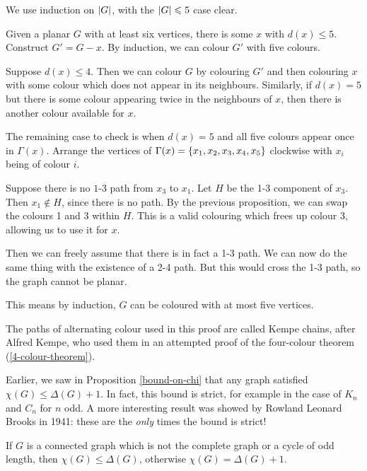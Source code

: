 \documentclass{article}
\begin{document}
\begin{prf}
    We use induction on $\left\lvert G \right\rvert$, with the $\left\lvert G \right\rvert \leqslant 5$ case clear.

	Given a planar $G$ with at least six vertices, there is some $x$ with $d(x) \leq 5$. Construct $G' = G - x$. By induction, we can colour $G'$ with five colours.

	Suppose $d(x) \leq 4$. Then we can colour $G$ by colouring $G'$ and then colouring $x$ with some colour which does not appear in its neighbours. Similarly, if $d(x) = 5$ but there is some colour appearing twice in the neighbours of $x$, then there is another colour available for $x$.
	
	The remaining case to check is when $d(x) = 5$ and all five colours appear once in $\Gamma(x)$. Arrange the vertices of $\Gamma(x) = \left\lbrace x_1, x_2, x_3, x_4, x_5 \right\rbrace$ clockwise with $x_i$ being of colour $i$.

	Suppose there is no $1$-$3$ path from $x_3$ to $x_1$. Let $H$ be the 1-3 component of $x_3$. Then $x_1 \notin H$, since there is no path. By the previous proposition, we can swap the colours 1 and 3 within $H$. This is a valid colouring which frees up colour 3, allowing us to use it for $x$.

	Then we can freely assume that there is in fact a 1-3 path. We can now do the same thing with the existence of a 2-4 path. But this would cross the 1-3 path, so the graph cannot be planar.

	This means by induction, $G$ can be coloured with at most five vertices.
\end{prf}

\begin{note}
	The paths of alternating colour used in this proof are called Kempe chains, after Alfred Kempe, who used them in an attempted proof of the four-colour theorem (\ref{4-colour-theorem}).
\end{note}

Earlier, we saw in Proposition \ref{bound-on-chi} that any graph satisfied $\chi(G) \leq \Delta(G) + 1$. In fact, this bound is strict, for example in the case of $K_n$ and $C_n$ for $n$ odd. A more interesting result was showed by Rowland Leonard Brooks in 1941: these are the \textit{only} times the bound is strict!

\begin{theorem}
    \label{brooks-theorem}
    If $G$ is a connected graph which is not the complete graph or a cycle of odd length, then $\chi(G) \leq \Delta(G)$, otherwise $\chi(G) = \Delta(G) + 1$.
\end{theorem}
\end{document}
